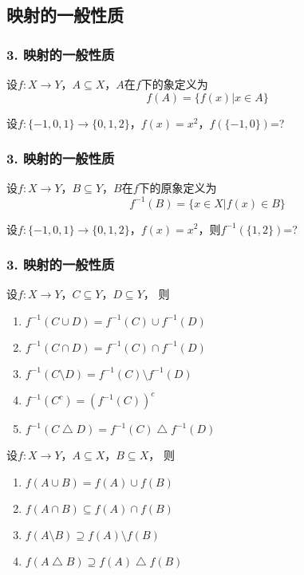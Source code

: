 \documentclass{beamer}
\begin{document}
\begin{CJK*}{UTF8}{gbsn}
\section{映射的一般性质}
\begin{frame}
  \frametitle{3. 映射的一般性质}
  \begin{Def}
    设$f:X\to Y$，$A \subseteq X$，$A$在$f$下的\alert{象}定义为\[f(A)=\{f(x)|x\in A\}\]
  \end{Def}\pause
  \begin{Ex}
    设$f:\{-1,0,1\}\to \{0,1,2\}$，$f(x)=x^2$，$f(\{-1,0\})$=?
  \end{Ex}
\end{frame}
\begin{frame}
  \frametitle{3. 映射的一般性质}
  \begin{Def}
    设$f:X\to Y$，$B \subseteq Y$，$B$在$f$下的\alert{原象}定义为\[f^{-1}(B)=\{x\in X|f(x)\in B\}\]
  \end{Def}\pause
  \begin{Ex}
    设$f:\{-1,0,1\}\to \{0,1,2\}$，$f(x)=x^2$，则$f^{-1}(\{1,2\})$=?
  \end{Ex}
\end{frame}

\begin{frame}
  \frametitle{3. 映射的一般性质}
  \begin{Thm}
    设$f:X\to Y$，$C \subseteq Y$，$D \subseteq Y$， 则
    \begin{enumerate}[(1)]
    \item $f^{-1}(C \cup D) = f^{-1}(C) \cup f^{-1}(D)$
    \item $f^{-1}(C \cap D) = f^{-1}(C) \cap f^{-1}(D)$
    \item $f^{-1}(C \setminus D)=f^{-1}(C) \setminus f^{-1}(D)$
    \item $f^{-1}(C^c) = (f^{-1}(C))^c$
    \item $f^{-1}(C \bigtriangleup D) = f^{-1}(C) \bigtriangleup f^{-1}(D)$
    \end{enumerate}
  \end{Thm}
    \begin{Thm}
    设$f:X\to Y$，$A \subseteq X$，$B \subseteq X$， 则
    \begin{enumerate}[(1)]
    \item $f(A \cup B) = f(A) \cup f(B)$
    \item $f(A \cap B) \subseteq f(A) \cap f(B)$
    \item $f(A \setminus B) \supseteq f(A) \setminus f(B)$
    \item $f(A \bigtriangleup B) \supseteq f(A) \bigtriangleup f(B)$
    \end{enumerate}
  \end{Thm}


\end{frame}
\end{CJK*}
\end{document}
